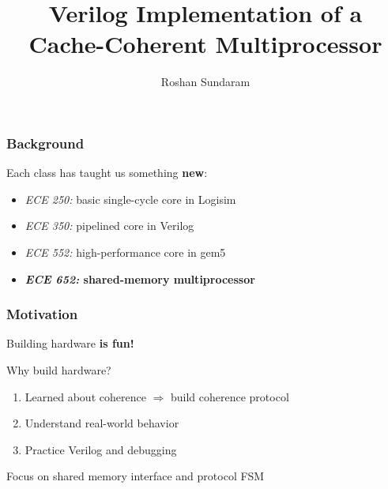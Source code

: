 \documentclass{beamer}
\title[Final Project] %
{Verilog Implementation of a\\ \textbf{Cache-Coherent Multiprocessor}}
\date[2005] %
\author[\today] %
{Roshan Sundaram}
\begin{document}
\frame{\titlepage}


\begin{frame}
\frametitle{Background}
\begin{tcolorbox}[colback=blue!5!white,colframe=blue!75!black]
  \begin{center}

  Each class has taught us something \textbf{new}:
  \begin{itemize}
    \item \textit{ECE 250:} basic single-cycle core in Logisim 
    \item \textit{ECE 350:} pipelined core in Verilog
    \item \textit{ECE 552:} high-performance core in gem5
    \item \textbf{\textit{ECE 652:} shared-memory multiprocessor}
  \end{itemize}
  \end{center}


\end{tcolorbox}


\end{frame}


\begin{frame}
\frametitle{Motivation}

\begin{tcolorbox}[colback=blue!5!white,colframe=blue!75!black]
  \begin{center}


    Building hardware \textbf{is fun!}
  \end{center}

\end{tcolorbox}



Why build hardware?
\begin{enumerate} 
  \item Learned about coherence $\Longrightarrow$ build coherence protocol
  \item Understand real-world behavior
  \item Practice Verilog and debugging
\end{enumerate}


\begin{tcolorbox}[colback=graphcolor,colframe=graphcolor!75!black]
  \begin{center}
    Focus on shared memory interface and protocol FSM
  \end{center}
\end{tcolorbox}



\end{frame}
\end{document}
